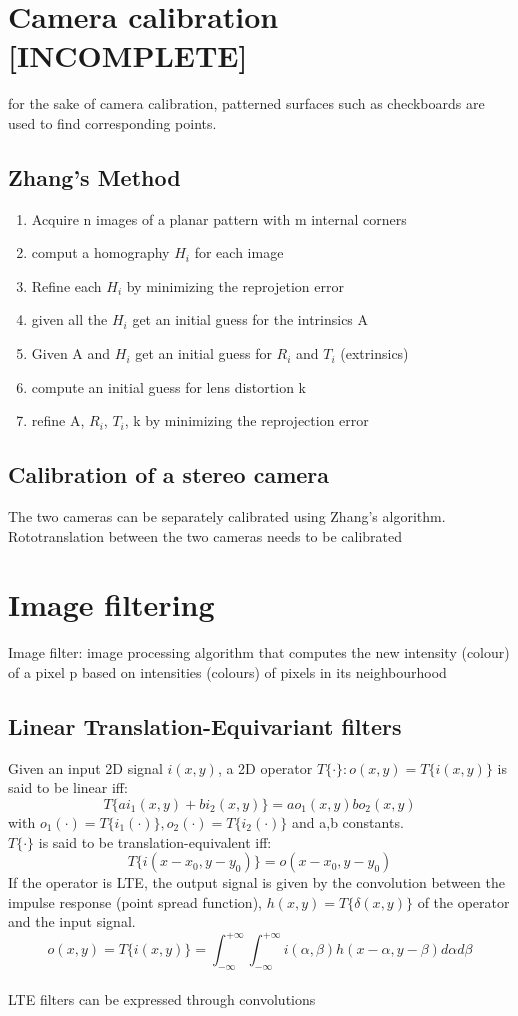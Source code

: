 \documentclass{article}
\begin{document}
\section{Camera calibration [INCOMPLETE]}
for the sake of camera calibration, patterned surfaces such as checkboards are used to find corresponding points.
\subsection{Zhang's Method}
\begin{enumerate}
    \item Acquire n images of a planar pattern with m internal corners
    \item comput a homography $H_i$ for each image
    \item Refine each $H_i$ by minimizing the reprojetion error
    \item given all the $H_i$ get an initial guess for the intrinsics A
    \item Given A and $H_i$ get an initial guess for $R_i$ and $T_i$ (extrinsics)
    \item compute an initial guess for lens distortion k
    \item refine A, $R_i$, $T_i$, k by minimizing the reprojection error
\end{enumerate}

\subsection{Calibration of a stereo camera}
The two cameras can be separately calibrated using Zhang's algorithm.\\
Rototranslation between the two cameras needs to be calibrated

\section{Image filtering}
Image filter: image processing algorithm that computes the new intensity (colour) of a pixel p based on intensities (colours) of pixels in its neighbourhood
\subsection{Linear Translation-Equivariant filters}
Given an input 2D signal $i(x,y)$, a 2D operator $T\{\cdot\}:o(x,y)=T\{i(x,y)\}$ is said to be linear iff:
$$T\{ai_1(x,y)+bi_2(x,y)\}=ao_1(x,y)bo_2(x,y)$$ with $o_1(\cdot)=T\{i_1(\cdot)\}, o_2(\cdot)=T\{i_2(\cdot)\}$ and a,b constants.\\
$T\{\cdot\}$ is said to be translation-equivalent iff:
$$T\{i(x-x_0,y-y_0)\}=o(x-x_0,y-y_0)$$
If the operator is LTE, the output signal is given by the convolution between the impulse response (point spread function), $h(x,y)=T\{\delta(x,y)\}$ of the operator and the input signal.
$$o(x,y)=T\{i(x,y)\}=\int_{-\infty}^{+\infty} \int_{-\infty}^{+\infty} i(\alpha,\beta)h(x-\alpha,y-\beta)d\alpha d\beta$$\\
LTE filters can be expressed through convolutions
\end{document}
